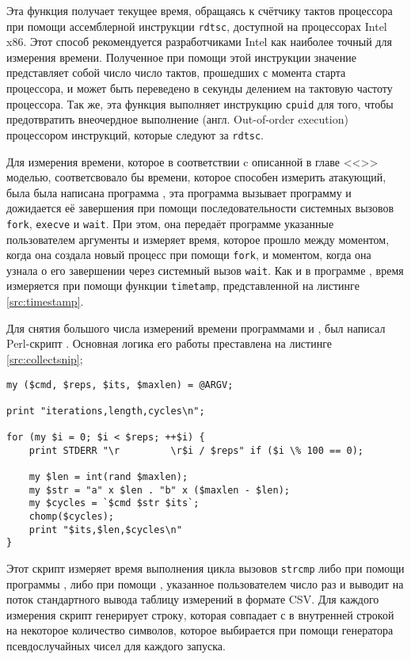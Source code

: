 Эта функция получает текущее время, обращаясь к счётчику тактов процессора при
помощи ассемблерной инструкции \texttt{rdtsc}, доступной на процессорах Intel x86.
Этот способ рекомендуется разработчиками Intel \cite{rdtsc} как наиболее точный для измерения
времени. Полученное при помощи этой инструкции значение представляет собой число
число тактов, прошедших с момента старта процессора, и может быть переведено в
секунды делением на тактовую частоту процессора. Так же, эта функция выполняет инструкцию
\texttt{cpuid} для того, чтобы предотвратить внеочердное выполнение
(англ. Out-of-order execution) процессором инструкций, которые следуют за \texttt{rdtsc}.

Для измерения времени, которое в соответствии c описанной в главе <<>>
моделью, соответсвовало бы времени, которое способен измерить атакующий, была
была написана программа , эта программа вызывает программу
 и дожидается её завершения при помощи последовательности системных
вызовов \texttt{fork}, \texttt{execve} и \texttt{wait}. При этом, она передаёт
программе  указанные пользователем аргументы и измеряет время, которое
прошло между моментом, когда она создала новый процесс при помощи \texttt{fork},
и моментом, когда она узнала о его завершении через системный вызов \texttt{wait}.
Как и в программе , время измеряется при помощи функции \texttt{timetamp},
представленной на листинге \ref{src:timestamp}.

Для снятия большого числа измерений времени программами  и
, был написал Perl-скрипт . Основная логика его
работы преставлена на листинге \ref{src:collectsnip};

\begin{lstlisting}[caption=Фрагмент скрипта \texttt{collect.pl}, label=src:collectsnip]
my ($cmd, $reps, $its, $maxlen) = @ARGV;

print "iterations,length,cycles\n";

for (my $i = 0; $i < $reps; ++$i) {
	print STDERR "\r         \r$i / $reps" if ($i \% 100 == 0);

	my $len = int(rand $maxlen);
	my $str = "a" x $len . "b" x ($maxlen - $len);
	my $cycles = `$cmd $str $its`;
	chomp($cycles);
	print "$its,$len,$cycles\n"
}
\end{lstlisting}

Этот скрипт измеряет время выполнения цикла вызовов \texttt{strcmp} либо при помощи
программы , либо при помощи , указанное пользователем
число раз и выводит на поток стандартного вывода таблицу измерений в формате CSV.
Для каждого измерения скрипт генерирует строку, которая совпадает с в внутренней строкой 
 на некоторое количество символов, которое выбирается при помощи генератора
псевдослучайных чисел для каждого запуска.

